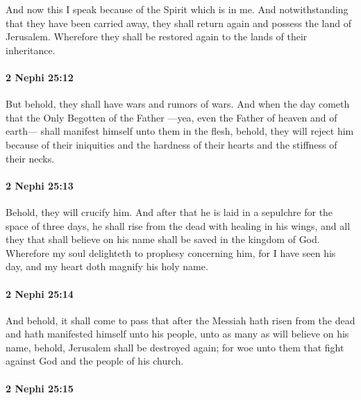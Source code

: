 			And now this I speak because of the Spirit which is in me.
			And notwithstanding that they have been carried away,
			they shall return again and possess the land of Jerusalem.
			Wherefore they shall be restored again to the lands of their inheritance.

		\paragraph{2 Nephi 25:12} %
			\label{2NEPHI-25-12}

			But behold, they shall have wars and rumors of wars.
			And when the day cometh that the Only Begotten of the Father
			---yea, even the Father of heaven and of earth---
			shall manifest himself unto them in the flesh,
			behold, they will reject him because of their iniquities
			and the hardness of their hearts and the stiffness of their necks.

		\paragraph{2 Nephi 25:13} %
			\label{2NEPHI-25-13}

			Behold, they will crucify him.
			And after that he is laid in a sepulchre for the space of three days,
			he shall rise from the dead with healing in his wings,
			and all they that shall believe on his name shall be saved in the kingdom of God.
			Wherefore my soul delighteth to prophesy concerning him,
			for I have seen his day, and my heart doth magnify his holy name.

		\paragraph{2 Nephi 25:14} %
			\label{2NEPHI-25-14}

			And behold, it shall come to pass that
			after the Messiah hath risen from the dead
			and hath manifested himself unto his people,
			unto as many as will believe on his name,
			behold, Jerusalem shall be destroyed again;
			for woe unto them that fight against God and the people of his church.

		\paragraph{2 Nephi 25:15} %
			\label{2NEPHI-25-15}

